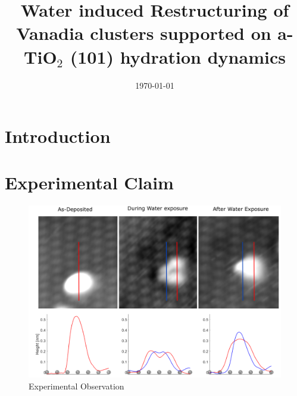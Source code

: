 \documentclass[aip,amsmath,amssymb,reprint, jcp]{revtex4-1}
\begin{document}
\title[]{Water induced Restructuring of Vanadia clusters supported on a-TiO$_2$ (101) hydration dynamics}
 
\date{\today}%

\begin{abstract}

\end{abstract}
\maketitle

\section{\label{sec:introduction}Introduction}
\section{Experimental Claim}
\begin{figure}
\centering
\includegraphics[width=1.0\textwidth]{Expert_claim.png}
\caption{Experimental Observation}
\label{fig:exptobser}
\end{figure}
\end{document}
